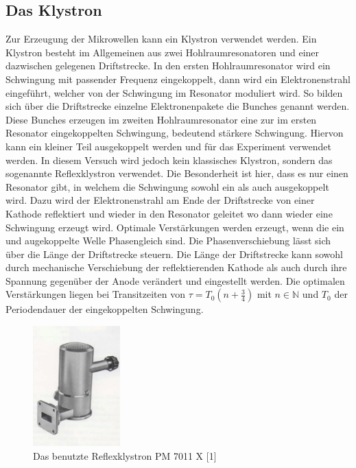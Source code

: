 \subsection{Das Klystron}
\label{sec:thklystron}
Zur Erzeugung der Mikrowellen kann ein Klystron verwendet werden. Ein Klystron besteht im Allgemeinen 
aus zwei Hohlraumresonatoren und einer dazwischen gelegenen Driftstrecke. In den ersten Hohlraumresonator 
wird ein Schwingung mit passender Frequenz eingekoppelt, dann wird ein Elektronenstrahl eingeführt, welcher 
von der Schwingung im Resonator moduliert wird. So bilden sich über die Driftstrecke 
einzelne Elektronenpakete die Bunches genannt werden. Diese Bunches erzeugen im zweiten Hohlraumresonator eine
zur im ersten Resonator eingekoppelten Schwingung, bedeutend stärkere Schwingung. Hiervon kann ein kleiner Teil 
ausgekoppelt werden und für das Experiment verwendet werden. In diesem Versuch wird jedoch kein klassisches
Klystron, sondern das sogenannte Reflexklystron verwendet. Die Besonderheit ist hier, dass es nur einen Resonator 
gibt, in welchem die Schwingung sowohl ein als auch ausgekoppelt wird. Dazu wird der Elektronenstrahl am Ende der 
Driftstrecke von einer Kathode reflektiert und wieder in den Resonator geleitet wo dann wieder eine Schwingung
erzeugt wird. Optimale Verstärkungen werden erzeugt, wenn die ein und augekoppelte Welle Phasengleich sind. 
Die Phasenverschiebung lässt sich über die Länge der Driftstrecke steuern. Die Länge der Driftstrecke kann 
sowohl durch mechanische Verschiebung der reflektierenden Kathode als auch durch ihre Spannung gegenüber 
der Anode verändert und eingestellt werden. Die optimalen Verstärkungen liegen bei Transitzeiten von
$\tau=T_0(n+\frac{3}{4})$ mit $n \in \mathbb{N}$ und $T_0$ der Periodendauer der eingekoppelten Schwingung.

\begin{figure}
    \centering
    \includegraphics[width=0.3\textwidth,angle=0]{content/grafiken/Klystron.PNG}
    \caption{Das benutzte Reflexklystron PM 7011 X [1]}
    \label{fig:Klystron}
  \end{figure}

